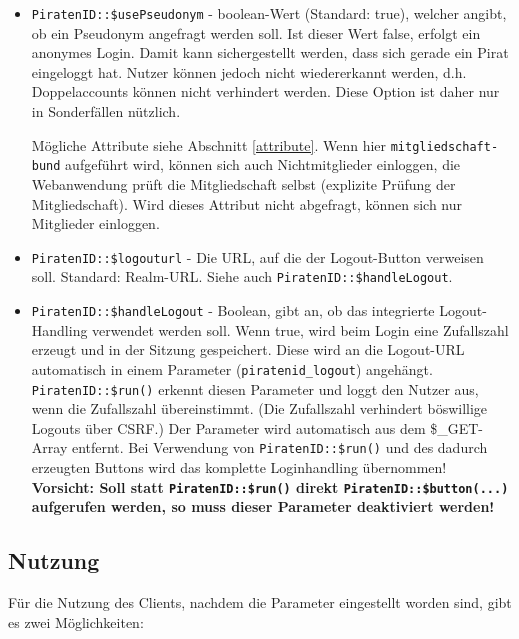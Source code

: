 \begin{itemize}
	\item \texttt{PiratenID::\$usePseudonym} - boolean-Wert (Standard: true), welcher angibt, ob ein Pseudonym angefragt werden soll.
											Ist dieser Wert false, erfolgt ein anonymes Login.
											Damit kann sichergestellt werden, dass sich gerade ein Pirat eingeloggt hat.
											Nutzer können jedoch nicht wiedererkannt werden, d.h. Doppelaccounts können nicht verhindert werden.
											Diese Option ist daher nur in Sonderfällen nützlich.
								
											Mögliche Attribute siehe Abschnitt \ref{attribute}.
											Wenn hier  \texttt{mitgliedschaft-bund} aufgeführt wird, können sich auch Nichtmitglieder einloggen,
											die Webanwendung prüft die Mitgliedschaft selbst (explizite Prüfung der Mitgliedschaft).
											Wird dieses Attribut nicht abgefragt, können sich nur Mitglieder einloggen.
	
	\item \texttt{PiratenID::\$logouturl} - Die URL, auf die der Logout-Button verweisen soll. Standard: Realm-URL.
											Siehe auch \texttt{PiratenID::\$handleLogout}.

	\item \texttt{PiratenID::\$handleLogout} - Boolean, gibt an, ob das integrierte Logout-Handling verwendet werden soll.
											Wenn true, wird beim Login eine Zufallszahl erzeugt und in der Sitzung gespeichert.
											Diese wird an die Logout-URL automatisch in einem Parameter (\texttt{piratenid\_logout}) angehängt.
											\texttt{PiratenID::\$run()} erkennt diesen Parameter und loggt den Nutzer aus,
											wenn die Zufallszahl übereinstimmt. (Die Zufallszahl verhindert böswillige Logouts über CSRF.)
											Der Parameter wird automatisch aus dem \$\_GET-Array entfernt.
											Bei Verwendung von \texttt{PiratenID::\$run()} und des dadurch erzeugten Buttons
											wird das komplette Loginhandling übernommen!
											\\\textbf{Vorsicht:
												Soll statt \texttt{PiratenID::\$run()} direkt \texttt{PiratenID::\$button(...)} aufgerufen werden,
												so muss dieser Parameter deaktiviert werden! }

\end{itemize}

\subsection{Nutzung}
Für die Nutzung des Clients, nachdem die Parameter eingestellt worden sind, gibt es zwei Möglichkeiten:

